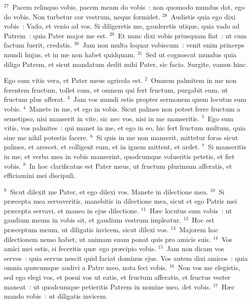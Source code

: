 ${}^{27}$~Pacem relinquo vobis, pacem meam do vobis~: non quomodo mundus dat, ego do vobis. Non turbetur cor vestrum, neque formidet.
${}^{28}$~Audistis quia ego dixi vobis~: Vado, et venio ad vos. Si diligeretis me, gauderetis utique, quia vado ad Patrem~: quia Pater major me est.
${}^{29}$~Et nunc dixi vobis priusquam fiat~: ut cum factum fuerit, credatis.
${}^{30}$~Jam non multa loquar vobiscum~: venit enim princeps mundi hujus, et in me non habet quidquam.
${}^{31}$~Sed ut cognoscat mundus quia diligo Patrem, et sicut mandatum dedit mihi Pater, sic facio. Surgite, eamus hinc.

\lettrine[lines=10,image=true,loversize=0.05,lraise=-0.03]{E}{}go sum vitis vera, et Pater meus agricola est.
${}^{2}$~Omnem palmitem in me non ferentem fructum, tollet eum, et omnem qui fert fructum, purgabit eum, ut fructum plus afferat.
${}^{3}$~Jam vos mundi estis propter sermonem quem locutus sum vobis.
${}^{4}$~Manete in me, et ego in vobis. Sicut palmes non potest ferre fructum a semetipso, nisi manserit in vite, sic nec vos, nisi in me manseritis.
${}^{5}$~Ego sum vitis, vos palmites~: qui manet in me, et ego in eo, hic fert fructum multum, quia sine me nihil potestis facere.
${}^{6}$~Si quis in me non manserit, mittetur foras sicut palmes, et arescet, et colligent eum, et in ignem mittent, et ardet.
${}^{7}$~Si manseritis in me, et verba mea in vobis manserint, quodcumque volueritis petetis, et fiet vobis.
${}^{8}$~In hoc clarificatus est Pater meus, ut fructum plurimum afferatis, et efficiamini mei discipuli.


${}^{9}$~Sicut dilexit me Pater, et ego dilexi vos. Manete in dilectione mea.
${}^{10}$~Si pr\ae cepta mea servaveritis, manebitis in dilectione mea, sicut et ego Patris mei pr\ae cepta servavi, et maneo in ejus dilectione.
${}^{11}$~H\ae c locutus sum vobis~: ut gaudium meum in vobis sit, et gaudium vestrum impleatur.
${}^{12}$~Hoc est pr\ae ceptum meum, ut diligatis invicem, sicut dilexi vos.
${}^{13}$~Majorem hac dilectionem nemo habet, ut animam suam ponat quis pro amicis suis.
${}^{14}$~Vos amici mei estis, si feceritis qu\ae\ ego pr\ae cipio vobis.
${}^{15}$~Jam non dicam vos servos~: quia servus nescit quid faciat dominus ejus. Vos autem dixi amicos~: quia omnia qu\ae cumque audivi a Patre meo, nota feci vobis.
${}^{16}$~Non vos me elegistis, sed ego elegi vos, et posui vos ut eatis, et fructum afferatis, et fructus vester maneat~: ut quodcumque petieritis Patrem in nomine meo, det vobis.
${}^{17}$~H\ae c mando vobis~: ut diligatis invicem.


